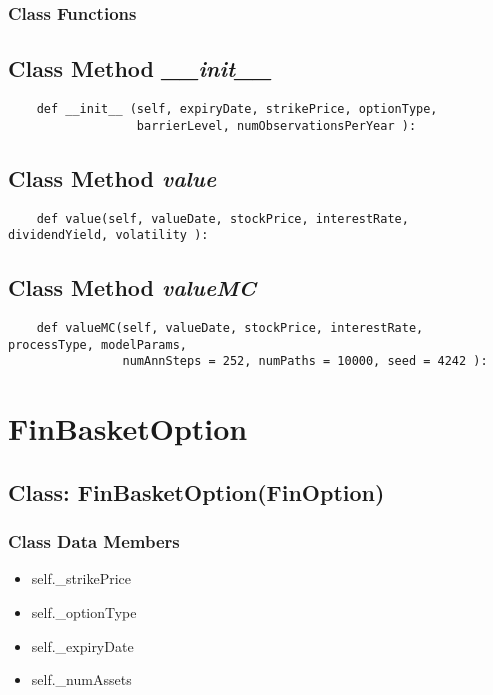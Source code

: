 \documentclass[twoside,11pt]{book}
\begin{document}
\subsubsection{Class Functions}

\subsection{Class Method {\it \_\_init\_\_ }}


\begin{lstlisting}
    def __init__ (self, expiryDate, strikePrice, optionType, 
                  barrierLevel, numObservationsPerYear ):
\end{lstlisting}

\subsection{Class Method {\it value}}


\begin{lstlisting}
    def value(self, valueDate, stockPrice, interestRate, dividendYield, volatility ):
\end{lstlisting}

\subsection{Class Method {\it valueMC}}


\begin{lstlisting}
    def valueMC(self, valueDate, stockPrice, interestRate, processType, modelParams, 
                numAnnSteps = 252, numPaths = 10000, seed = 4242 ):
\end{lstlisting}

\newpage
\section{FinBasketOption}

\subsection{Class: FinBasketOption(FinOption)}


\subsubsection{Class Data Members}
\begin{itemize}
\item{self.\_strikePrice}
\item{self.\_optionType}
\item{self.\_expiryDate}
\item{self.\_numAssets}
\end{itemize}
\end{document}
